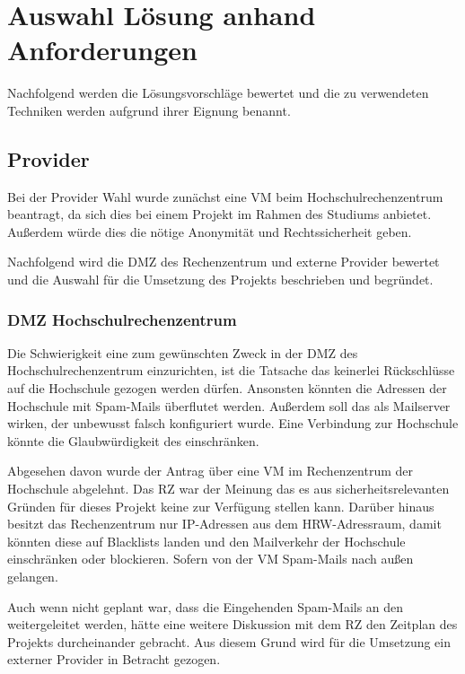 \documentclass[a4paper,11pt,singlespacing]{article}
\begin{document}
\newpage
\section{Auswahl Lösung anhand Anforderungen}\label{sec:AuswahlLösungAnhandAnforderungen}
	Nachfolgend werden die Lösungsvorschläge bewertet und die zu verwendeten Techniken werden aufgrund ihrer Eignung benannt.
	\subsection{Provider}\label{sec:AuswahlLösungProvider}
		Bei der Provider Wahl wurde zunächst eine VM beim Hochschulrechenzentrum  beantragt, da sich dies bei einem Projekt im Rahmen des Studiums anbietet. Außerdem würde dies die nötige Anonymität und Rechtssicherheit geben.
		
		Nachfolgend wird die DMZ des Rechenzentrum und externe Provider bewertet und die Auswahl für die Umsetzung des Projekts beschrieben und begründet.
		
		\subsubsection{DMZ Hochschulrechenzentrum}\label{sec:AuswahlLösungDMZHochschulrechenzentrum}
			Die Schwierigkeit eine  zum gewünschten Zweck in der DMZ des Hochschulrechenzentrum einzurichten, ist die Tatsache das keinerlei Rückschlüsse auf die Hochschule gezogen werden dürfen. Ansonsten könnten die Adressen der Hochschule mit Spam-Mails überflutet werden. Außerdem soll das  als Mailserver wirken, der unbewusst falsch konfiguriert wurde. Eine Verbindung zur Hochschule könnte die Glaubwürdigkeit des  einschränken.
			
			Abgesehen davon wurde der Antrag über eine VM im Rechenzentrum der Hochschule abgelehnt. Das RZ war der Meinung das es aus sicherheitsrelevanten Gründen für dieses Projekt keine  zur Verfügung stellen kann. Darüber hinaus besitzt das Rechenzentrum nur IP-Adressen aus dem HRW-Adressraum, damit könnten diese auf Blacklists landen und den Mailverkehr der Hochschule einschränken oder blockieren. Sofern von der VM Spam-Mails nach außen gelangen.
			
			Auch wenn nicht geplant war, dass die Eingehenden Spam-Mails an den  weitergeleitet werden, hätte eine weitere Diskussion mit dem RZ den Zeitplan des Projekts durcheinander gebracht. Aus diesem Grund wird für die Umsetzung ein externer Provider in Betracht gezogen.
		
\end{document}
